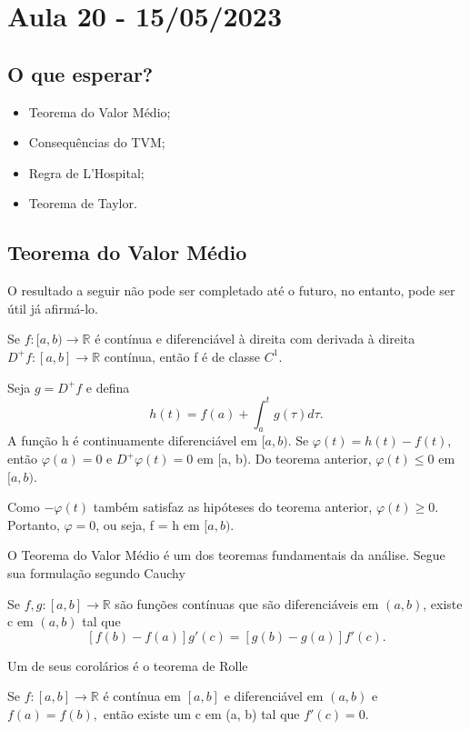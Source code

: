 \documentclass[analysis_notes.tex]{subfiles}
\begin{document}
\section{Aula 20 - 15/05/2023}
\subsection{O que esperar?}
\begin{itemize}
	\item Teorema do Valor Médio;
	\item Consequências do TVM;
	\item Regra de L'Hospital;
	\item Teorema de Taylor.
\end{itemize}
\subsection{Teorema do Valor Médio}
O resultado a seguir não pode ser completado até o futuro, no entanto, pode
ser útil já afirmá-lo.
\hypertarget{incomplete_1}{\begin{crl*}
		Se \(f:[a, b)\rightarrow \mathbb{R}\) é contínua e diferenciável à direita com
		derivada à direita \(D^{+}f:[a, b]\rightarrow \mathbb{R}\) contínua, então f é de classe
		\(C^{1}\).
	\end{crl*}}
\begin{proof*}
	Seja \(g = D^{+}f\) e defina
	\[
		h(t) = f(a) + \int_{a}^{t} g(\tau )d\tau.
	\]
	A fun\c cão h é continuamente diferenciável em \([a, b)\). Se \(\varphi (t) = h(t)-f(t)\),
	então \(\varphi (a) = 0\) e \(D^{+}\varphi (t) = 0\) em [a, b). Do teorema anterior,
	\(\varphi (t)\leq 0\) em \([a, b)\).

	Como \(-\varphi (t)\) também satisfaz as hipóteses do teorema anterior, \(\varphi (t)\geq 0\).
	Portanto, \(\varphi = 0\), ou seja, f = h em \([a, b)\). \qedsymbol
\end{proof*}
O Teorema do Valor Médio é um dos teoremas fundamentais da análise. Segue sua formula\c cão segundo
Cauchy
\hypertarget{cauchy_mvt}{
	\begin{theorem*}
		Se \(f, g:[a, b]\rightarrow \mathbb{R}\) são fun\c cões contínuas que são
		diferenciáveis em \((a, b)\), existe c em \((a, b)\) tal que
		\[
			[f(b)-f(a)]g'(c) = [g(b)-g(a)]f'(c).
		\]
	\end{theorem*}}
Um de seus corolários é o teorema de Rolle
\hypertarget{Rolle}{
	\begin{crl*}
		Se \(f:[a, b]\rightarrow \mathbb{R}\) é contínua em \([a, b]\) e diferenciável
		em \((a, b)\) e \(f(a)=f(b),\) então existe um c em (a, b) tal que \(f'(c) = 0.\)
	\end{crl*}}
\end{document}

